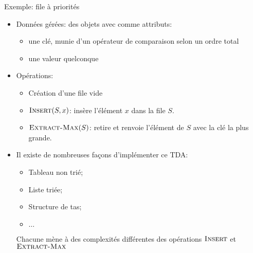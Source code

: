 \begin{frame}{Exemple: file à priorités}

\begin{itemize}
\item Données gérées: des objets avec comme attributs:
\begin{itemize}
\item une clé, munie d'un opérateur de comparaison selon un ordre total
\item une valeur quelconque
\end{itemize}
\medskip
\item Opérations:
\begin{itemize}
\item Création d'une file vide
\item $\textnormal{\scshape Insert}(S,x)$: insère l'élément $x$ dans la file $S$.
\item $\textnormal{\scshape Extract-Max}(S)$: retire et renvoie l'élément de $S$ avec
  la clé la plus grande.
\end{itemize}
\medskip
\item Il existe de nombreuses façons d'implémenter ce TDA:
\begin{itemize}
\item Tableau non trié;
\item Liste triée;
\item Structure de tas;
\item $\ldots$
\end{itemize}
Chacune mène à des complexités différentes des opérations $\textnormal{\scshape Insert}$ et $\textnormal{\scshape Extract-Max}$
\end{itemize}

\end{frame}

